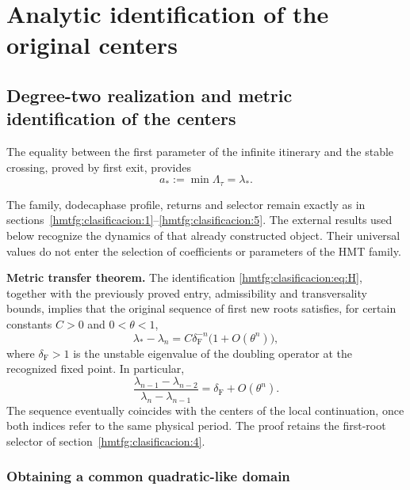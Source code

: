 \section{Analytic identification of the original centers}
\label{hmtfg:fragmento:identificacion-analitica-de-los-centros-originales}

\subsection{Degree-two realization and metric identification of the centers}
\label{hmtfg:clasificacion:8}

The equality between the first parameter of the infinite itinerary and the stable crossing, proved by first exit, provides
\begin{equation}
\boxed{a_*:=\min\Lambda_\tau=\lambda_*.}
\label{hmtfg:clasificacion:eq:H}
\end{equation}

The family, dodecaphase profile, returns and selector remain exactly as in sections~\ref{hmtfg:clasificacion:1}--\ref{hmtfg:clasificacion:5}. The external results used below recognize the dynamics of that already constructed object. Their universal values do not enter the selection of coefficients or parameters of the HMT family.

\textbf{Metric transfer theorem.} The identification \eqref{hmtfg:clasificacion:eq:H}, together with the previously proved entry, admissibility and transversality bounds, implies that the original sequence of first new roots satisfies, for certain constants \(C>0\) and \(0<\theta<1\),
\begin{equation}
\boxed{\lambda_*-\lambda_n=C\delta_{\mathrm F}^{-n}
\bigl(1+O(\theta^n)\bigr),}
\label{hmtfg:clasificacion:eq:14}
\end{equation}
where \(\delta_{\mathrm F}>1\) is the unstable eigenvalue of the doubling operator at the recognized fixed point. In particular,
\begin{equation}
\frac{\lambda_{n-1}-\lambda_{n-2}}
     {\lambda_n-\lambda_{n-1}}
=\delta_{\mathrm F}+O(\theta^n).
\label{hmtfg:clasificacion:eq:15}
\end{equation}
The sequence eventually coincides with the centers of the local continuation, once both indices refer to the same physical period. The proof retains the first-root selector of section~\ref{hmtfg:clasificacion:4}.

\subsubsection{Obtaining a common quadratic-like domain}
\label{hmtfg:clasificacion:8.1}


